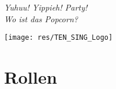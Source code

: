 \vspace*{\fill}
\begin{flushright}
\textit{Yuhuu! Yippieh! Party!}\\
\textit{Wo ist das Popcorn?}
\end{flushright}

\tableofcontents

\vspace{3mm}

\begin{minipage}{\textwidth}
\begin{center}
\texttt{[image: res/TEN\_SING\_Logo]}
\end{center}
\end{minipage}

\pagebreak

\setcounter{section}{-1}
\section{Rollen}
\usehyperlinkstrue
\ListOfPersons
\ListOfRequisites









